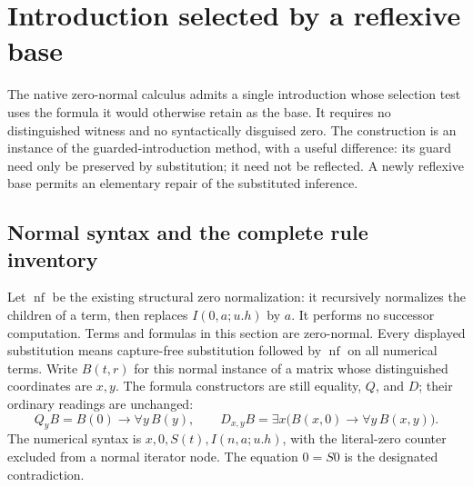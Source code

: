 \section{Introduction selected by a reflexive base}
\label{sec:reflexive-base}

The native zero-normal calculus admits a single introduction whose
selection test uses the formula it would otherwise retain as the base.
It requires no distinguished witness and no syntactically disguised zero.
The construction is an instance of the guarded-introduction method, with
a useful difference: its guard need only be preserved by substitution;
it need not be reflected.  A newly reflexive base permits an elementary
repair of the substituted inference.

\subsection{Normal syntax and the complete rule inventory}

Let $\operatorname{nf}$ be the existing structural zero normalization:
it recursively normalizes the children of a term, then replaces
$I(0,a;u.h)$ by $a$.  It performs no successor computation.
Terms and formulas in this section are zero-normal.  Every displayed
substitution means capture-free substitution followed by
$\operatorname{nf}$ on all numerical terms.  Write $B(t,r)$ for this
normal instance of a matrix whose distinguished coordinates are $x,y$.
The formula constructors are still equality, $Q$, and $D$; their ordinary
readings are unchanged:
\[
 Q_yB=B(0)\to\forall y\,B(y),\qquad
 D_{x,y}B=\exists x\bigl(B(x,0)\to\forall y\,B(x,y)\bigr).
\]
The numerical syntax is $x,0,S(t),I(n,a;u.h)$, with the literal-zero
counter excluded from a normal iterator node.  The equation $0=S0$ is
the designated contradiction.

